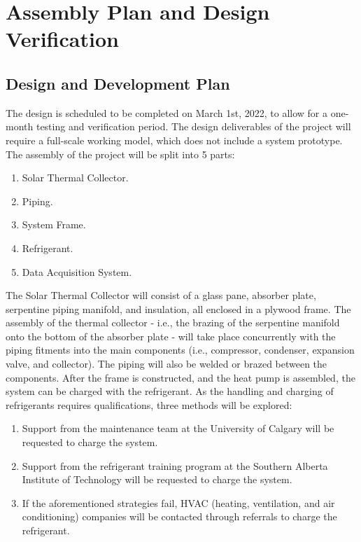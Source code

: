 \chapter{Assembly Plan and Design Verification}

\section{Design and Development Plan}

The design is scheduled to be completed on March 1st, 2022, to allow for a one-month testing and verification period. The design deliverables of the project will require a full-scale working model, which does not include a system prototype. The assembly of the project will be split into 5 parts:

\medskip
\begin{enumerate}[itemsep=3mm, parsep=-1mm, label=\roman*.]
    \item Solar Thermal Collector.
    \item Piping.
    \item System Frame.
    \item Refrigerant.
    \item Data Acquisition System.
\end{enumerate}

\medskip
The Solar Thermal Collector will consist of a glass pane, absorber plate, serpentine piping manifold, and insulation, all enclosed in a plywood frame. The assembly of the thermal collector - i.e., the brazing of the serpentine manifold onto the bottom of the absorber plate - will take place concurrently with the piping fitments into the main components (i.e., compressor, condenser, expansion valve, and collector). The piping will also be welded or brazed between the components. After the frame is constructed, and the heat pump is assembled, the system can be charged with the refrigerant. As the handling and charging of refrigerants requires qualifications, three methods will be explored: 

\medskip
\begin{enumerate}[itemsep=3mm, parsep=-1mm, label=\roman*.]
    \item Support from the maintenance team at the University of Calgary will be requested to charge the system. 
    \item Support from the refrigerant training program at the Southern Alberta Institute of Technology will be requested to charge the system. 
    \item If the aforementioned strategies fail, HVAC (heating, ventilation, and air conditioning) companies will be contacted through referrals to charge the refrigerant.
\end{enumerate}

